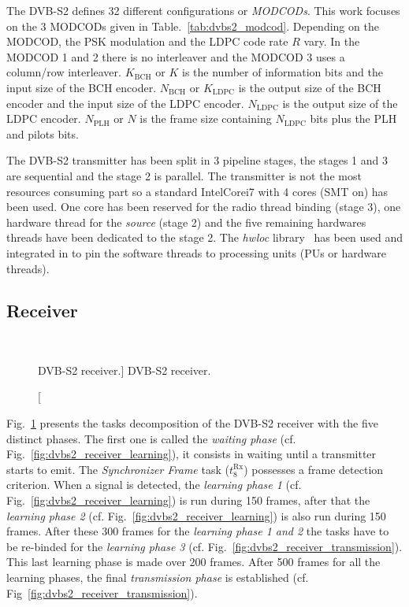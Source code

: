 The DVB-S2 defines 32 different configurations or \emph{MODCODs}. This work
focuses on the 3 MODCODs given in Table.~\ref{tab:dvbs2_modcod}. Depending on
the MODCOD, the PSK modulation and the LDPC code rate $R$ vary. In the MODCOD 1
and 2 there is no interleaver and the MODCOD 3 uses a column/row interleaver.
$K_\text{BCH}$ or $K$ is the number of information bits and the input size of
the BCH encoder. $N_\text{BCH}$ or $K_\text{LDPC}$ is the output size of the
BCH encoder and the input size of the LDPC encoder. $N_\text{LDPC}$ is the
output size of the LDPC encoder. $N_\text{PLH}$ or $N$ is the frame size
containing $N_\text{LDPC}$ bits plus the PLH and pilots bits.

The DVB-S2 transmitter has been split in 3 pipeline stages, the stages 1 and 3
are sequential and the stage 2 is parallel. The transmitter is not the most
resources consuming part so a standard Intel\R Core\TM i7 with 4 cores (SMT on)
has been used. One core has been reserved for the radio thread binding (stage
3), one hardware thread for the \emph{source} (stage 2) and the five remaining
hardwares threads have been dedicated to the stage 2. The \emph{hwloc}
library~\cite{Broquedis2010} has been used and integrated in \AFFECT to pin the
software threads to processing units (PUs or hardware threads).

\subsection{Receiver}

\begin{figure}[htp]
  \centering
  \\
  \caption
    [DVB-S2 receiver.]
    {DVB-S2 receiver.}
  \label{fig:dvbs2_receiver}
\end{figure}

Fig.~\ref{fig:dvbs2_receiver} presents the tasks decomposition of the DVB-S2
receiver with the five distinct phases. The first one is called the
\emph{waiting phase} (cf. Fig.~\ref{fig:dvbs2_receiver_learning}), it consists
in waiting until a transmitter starts to emit. The \emph{Synchronizer
Frame} task ($t^\text{Rx}_8$) possesses a frame detection criterion. When a
signal is detected, the \emph{learning phase 1} (cf.
Fig.~\ref{fig:dvbs2_receiver_learning}) is run during 150 frames, after that the
\emph{learning phase 2} (cf. Fig.~\ref{fig:dvbs2_receiver_learning}) is also run
during 150 frames. After these 300 frames for the \emph{learning phase 1 and 2}
the tasks have to be re-binded for the \emph{learning phase 3}
(cf. Fig.~\ref{fig:dvbs2_receiver_transmission}). This last learning phase is
made over 200 frames. After 500 frames for all the learning phases, the final
\emph{transmission phase} is established (cf.
Fig~\ref{fig:dvbs2_receiver_transmission}).

